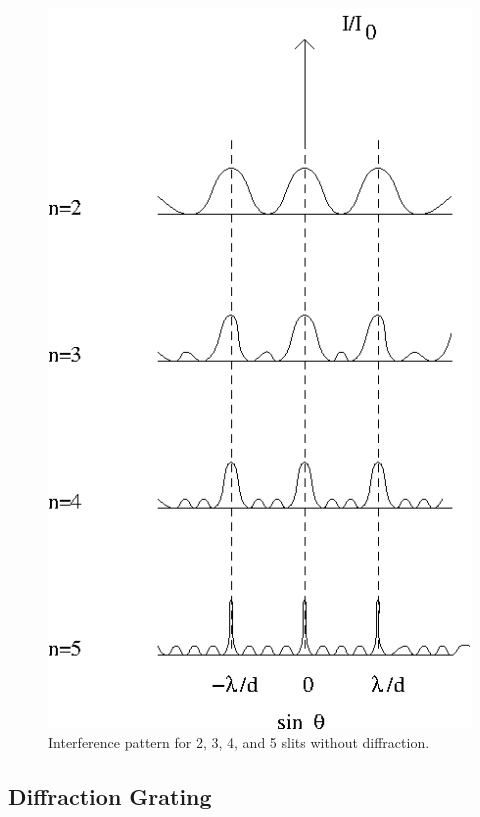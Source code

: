 \begin{figure}[htb]
\centering 
\epsfxsize=6cm \includegraphics{10_diffraction/internodiff.eps}
\caption{Interference pattern for 2, 3, 4, and 5 slits without diffraction.}
\label{fig:diff:intnodiff}
\end{figure}

\subsection{Diffraction Grating}

